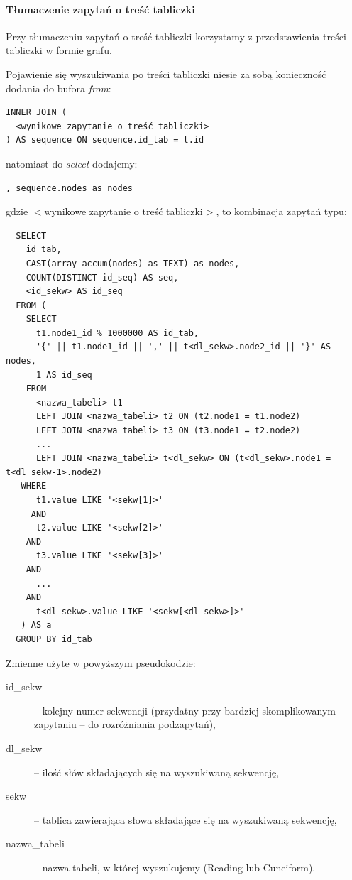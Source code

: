 \paragraph{Tłumaczenie zapytań o treść tabliczki}
Przy tłumaczeniu zapytań o treść tabliczki
korzystamy z przedstawienia treści tabliczki w formie grafu.

Pojawienie się wyszukiwania po treści tabliczki niesie za sobą konieczność dodania do bufora \textit{from}:
\begin{verbatim}
INNER JOIN (
  <wynikowe zapytanie o treść tabliczki>
) AS sequence ON sequence.id_tab = t.id
\end{verbatim}

natomiast do \textit{select} dodajemy:
\begin{verbatim}
, sequence.nodes as nodes
\end{verbatim}

gdzie $<$wynikowe zapytanie o treść tabliczki$>$, to kombinacja zapytań typu:
\begin{verbatim}
  SELECT 
    id_tab, 
    CAST(array_accum(nodes) as TEXT) as nodes, 
    COUNT(DISTINCT id_seq) AS seq, 
    <id_sekw> AS id_seq
  FROM (
    SELECT
      t1.node1_id % 1000000 AS id_tab,
      '{' || t1.node1_id || ',' || t<dl_sekw>.node2_id || '}' AS nodes,
      1 AS id_seq
    FROM
      <nazwa_tabeli> t1
      LEFT JOIN <nazwa_tabeli> t2 ON (t2.node1 = t1.node2)
      LEFT JOIN <nazwa_tabeli> t3 ON (t3.node1 = t2.node2)
      ...
      LEFT JOIN <nazwa_tabeli> t<dl_sekw> ON (t<dl_sekw>.node1 = t<dl_sekw-1>.node2)
   WHERE
      t1.value LIKE '<sekw[1]>'
     AND
      t2.value LIKE '<sekw[2]>'
    AND
      t3.value LIKE '<sekw[3]>'
    AND
      ...
    AND
      t<dl_sekw>.value LIKE '<sekw[<dl_sekw>]>'
   ) AS a 
  GROUP BY id_tab
\end{verbatim}
Zmienne użyte w powyższym pseudokodzie:
\begin{description}
 \item[id\_sekw] -- kolejny numer sekwencji (przydatny przy bardziej skomplikowanym zapytaniu -- do rozróżniania podzapytań),
 \item[dl\_sekw] -- ilość słów składających się na wyszukiwaną sekwencję,
 \item[sekw] -- tablica zawierająca słowa składające się na wyszukiwaną sekwencję,
\item[nazwa\_tabeli] -- nazwa tabeli, w której wyszukujemy (Reading lub Cuneiform).
 \end{description}

